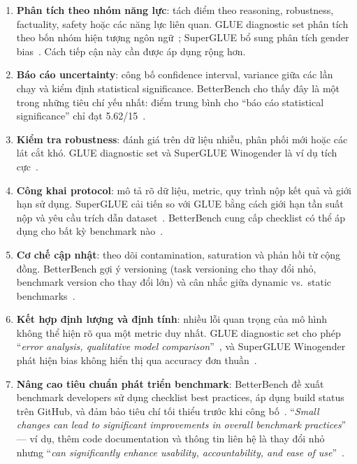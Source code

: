 \begin{enumerate}
    \item \textbf{Phân tích theo nhóm năng lực}: tách điểm theo reasoning, robustness, factuality, safety hoặc các năng lực liên quan. GLUE diagnostic set phân tích theo bốn nhóm hiện tượng ngôn ngữ~\cite{glue}; SuperGLUE bổ sung phân tích gender bias~\cite{superglue}. Cách tiếp cận này cần được áp dụng rộng hơn.

    \item \textbf{Báo cáo uncertainty}: công bố confidence interval, variance giữa các lần chạy và kiểm định statistical significance. BetterBench cho thấy đây là một trong những tiêu chí yếu nhất: điểm trung bình cho ``báo cáo statistical significance'' chỉ đạt 5.62/15~\cite{betterbench}.

    \item \textbf{Kiểm tra robustness}: đánh giá trên dữ liệu nhiễu, phân phối mới hoặc các lát cắt khó. GLUE diagnostic set và SuperGLUE Winogender là ví dụ tích cực~\cite{glue,superglue}.

    \item \textbf{Công khai protocol}: mô tả rõ dữ liệu, metric, quy trình nộp kết quả và giới hạn sử dụng. SuperGLUE cải tiến so với GLUE bằng cách giới hạn tần suất nộp và yêu cầu trích dẫn dataset~\cite{superglue}. BetterBench cung cấp checklist có thể áp dụng cho bất kỳ benchmark nào~\cite{betterbench}.

    \item \textbf{Cơ chế cập nhật}: theo dõi contamination, saturation và phản hồi từ cộng đồng. BetterBench gợi ý versioning (task versioning cho thay đổi nhỏ, benchmark version cho thay đổi lớn) và cân nhắc giữa dynamic vs.\ static benchmarks~\cite{betterbench}.

    \item \textbf{Kết hợp định lượng và định tính}: nhiều lỗi quan trọng của mô hình không thể hiện rõ qua một metric duy nhất. GLUE diagnostic set cho phép ``\textit{error analysis, qualitative model comparison}''~\cite{glue}, và SuperGLUE Winogender phát hiện bias không hiển thị qua accuracy đơn thuần~\cite{superglue}.

    \item \textbf{Nâng cao tiêu chuẩn phát triển benchmark}: BetterBench đề xuất benchmark developers sử dụng checklist best practices, áp dụng build status trên GitHub, và đảm bảo tiêu chí tối thiểu trước khi công bố~\cite{betterbench}. ``\textit{Small changes can lead to significant improvements in overall benchmark practices}'' --- ví dụ, thêm code documentation và thông tin liên hệ là thay đổi nhỏ nhưng ``\textit{can significantly enhance usability, accountability, and ease of use}''~\cite{betterbench}.
\end{enumerate}

